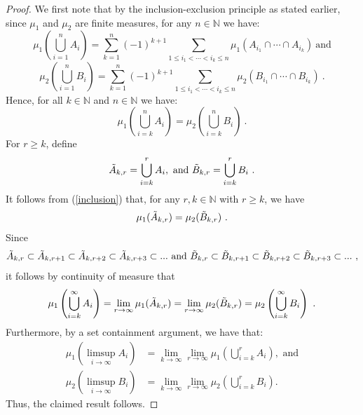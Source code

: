 \documentclass[12pt]{article}
\begin{document}
\begin{proof}
We first note that by the inclusion-exclusion principle as stated earlier, since $\mu_1$ and $\mu_2$ are finite measures, for any $n \in \mathbb{N}$ we have:
    \begin{equation}\label{inclusion exclusion}
        \mu_1 \left(\bigcup_{i=1}^{n} A_i \right) = \sum_{k=1}^{n} (-1)^{k+1} \sum_{1 \leq i_1 < \cdots < i_k \leq n} \mu_1 ( A_{i_1} \cap \cdots \cap A_{i_k} ) ~\text{and}
    \end{equation}
    \begin{equation}\label{inclusion exclusion for B}
        \mu_2 \left(\bigcup_{i=1}^{n} B_i \right) = \sum_{k=1}^{n} (-1)^{k+1} \sum_{1 \leq i_1 < \cdots < i_k \leq n} \mu_2 ( B_{i_1} \cap \cdots \cap B_{i_k} ) ~.
    \end{equation}
Hence, for all $k \in \mathbb{N}$ and $n\in \mathbb{N}$ we have:
\begin{equation}\label{inclusion}
    \mu_1 \left( \bigcup_{i=k}^{n} A_i \right) = \mu_2 \left( \bigcup_{i=k}^{n} B_i \right) ~.
\end{equation}
For $r \geq k$, define \[ \Tilde{A}_{k,r}= \bigcup_{i=k}^{r} A_i, \text{ and } \Tilde{B}_{k,r}= \bigcup_{i=k}^{r} B_i ~. \]
It follows from (\ref{inclusion}) that, for any $r,k \in \mathbb{N}$ with $r \geq k$, we have
\[\mu_1(\Tilde{A}_{k,r})=\mu_2(\Tilde{B}_{k,r}) ~.\]
Since
\[ \Tilde{A}_{k,r} \subset  \Tilde{A} _{k,r+1}\subset \Tilde{A}_{k,r+2} \subset \Tilde{A}_{k,r+3} \subset ... \text{ and } \Tilde{B}_{k,r} \subset  \Tilde{B} _{k,r+1}\subset \Tilde{B}_{k,r+2} \subset \Tilde{B}_{k,r+3} \subset ... ~,\]
it follows by continuity of measure that
\[ \mu_1 \left( \bigcup_{i=k}^{\infty} A_i \right) = \lim_{r \rightarrow \infty} \mu_1(\Tilde{A}_{k,r}) =\lim_{r \rightarrow \infty} \mu_2(\Tilde{B}_{k,r})= \mu_2 \left(\bigcup_{i=k}^{\infty} B_i \right) ~.\]
Furthermore, by a set containment argument, we have that:
\begin{align*}
  \mu_1\left(\limsup_{i \rightarrow \infty} A_i \right) &= \lim_{k\rightarrow \infty} \lim_{r\rightarrow \infty} \mu_1 \left(\bigcup_{i = k}^r A_i \right), \text{ and} \\
  \mu_2 \left(\limsup_{i \rightarrow \infty} B_i \right) &= \lim_{k\rightarrow \infty} \lim_{r\rightarrow \infty} \mu_2 \left(\bigcup_{i = k}^r B_i \right).
\end{align*}
Thus, the claimed result follows. \qedhere

\end{proof}
\end{document}
